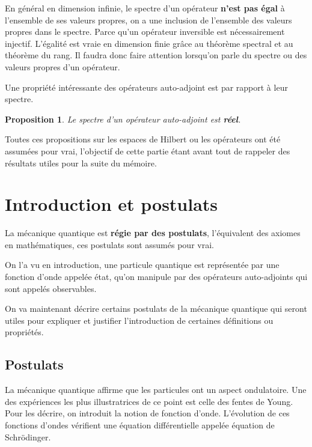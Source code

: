 \documentclass[a4paper, 12pt]{report}
\renewcommand{\.}{\cdot} %
\theoremstyle{break}
\newtheorem{proposition}{Proposition}
\theoremstyle{remark}
\theoremstyle{proofstyle}
\begin{document}
En général en dimension infinie, le spectre d'un opérateur \textbf{n'est pas égal} à l'ensemble de ses valeurs propres, on a une inclusion de l'ensemble des valeurs propres dans le spectre. Parce qu'un opérateur inversible est nécessairement injectif.
L'égalité est vraie en dimension finie grâce au théorème spectral et au théorème du rang. Il faudra donc faire attention lorsqu'on parle du spectre ou des valeurs propres d'un opérateur.\vspace{7pt}

Une propriété intéressante des opérateurs auto-adjoint est par rapport à leur spectre.
\begin{proposition}
    Le spectre d'un opérateur auto-adjoint est \textbf{réel}.
\end{proposition}

Toutes ces propositions sur les espaces de Hilbert ou les opérateurs ont été assumées pour vrai, l'objectif de cette partie étant avant tout de rappeler des résultats utiles pour la suite du mémoire.

\section{Introduction et postulats}

La mécanique quantique est \textbf{régie par des postulats}, l'équivalent des axiomes en mathématiques, ces postulats sont assumés pour vrai.\vspace{5pt}

On l'a vu en introduction, une particule quantique est représentée par une fonction d'onde appelée état, qu'on manipule par des opérateurs auto-adjoints qui sont appelés observables.\vspace{5pt}

On va maintenant décrire certains postulats de la mécanique quantique qui seront utiles pour expliquer et justifier l'introduction de certaines définitions ou propriétés.\vspace{4pt}


\subsection{Postulats}
La mécanique quantique affirme que les particules ont un aspect ondulatoire. Une des expériences les plus illustratrices de ce point est celle des fentes de Young. Pour les décrire, on introduit la notion de fonction d'onde. L'évolution de ces fonctions d'ondes vérifient une équation différentielle appelée équation de Schrödinger.
\end{document}

